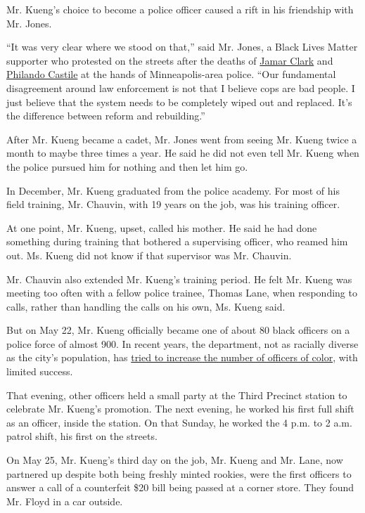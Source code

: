 Mr. Kueng's choice to become a police officer caused a rift in his
friendship with Mr. Jones.

``It was very clear where we stood on that,'' said Mr. Jones, a Black
Lives Matter supporter who protested on the streets after the deaths of
\href{https://www.nytimes3xbfgragh.onion/2015/11/20/us/minneapolis-protest-police-jamar-clark.html}{Jamar
Clark} and
\href{https://www.nytimes3xbfgragh.onion/2016/07/13/us/philando-castile-minnesota-police-shooting.html}{Philando
Castile} at the hands of Minneapolis-area police. ``Our fundamental
disagreement around law enforcement is not that I believe cops are bad
people. I just believe that the system needs to be completely wiped out
and replaced. It's the difference between reform and rebuilding.''

After Mr. Kueng became a cadet, Mr. Jones went from seeing Mr. Kueng
twice a month to maybe three times a year. He said he did not even tell
Mr. Kueng when the police pursued him for nothing and then let him go.

In December, Mr. Kueng graduated from the police academy. For most of
his field training, Mr. Chauvin, with 19 years on the job, was his
training officer.

At one point, Mr. Kueng, upset, called his mother. He said he had done
something during training that bothered a supervising officer, who
reamed him out. Ms. Kueng did not know if that supervisor was Mr.
Chauvin.

Mr. Chauvin also extended Mr. Kueng's training period. He felt Mr. Kueng
was meeting too often with a fellow police trainee, Thomas Lane, when
responding to calls, rather than handling the calls on his own, Ms.
Kueng said.

But on May 22, Mr. Kueng officially became one of about 80 black
officers on a police force of almost 900. In recent years, the
department, not as racially diverse as the city's population, has
\href{https://www.npr.org/2014/09/03/345308385/minneapolis-pd-makes-an-effort-to-hire-more-minority-officers}{tried
to increase the number of officers of color}, with limited success.

That evening, other officers held a small party at the Third Precinct
station to celebrate Mr. Kueng's promotion. The next evening, he worked
his first full shift as an officer, inside the station. On that Sunday,
he worked the 4 p.m. to 2 a.m. patrol shift, his first on the streets.

On May 25, Mr. Kueng's third day on the job, Mr. Kueng and Mr. Lane, now
partnered up despite both being freshly minted rookies, were the first
officers to answer a call of a counterfeit \$20 bill being passed at a
corner store. They found Mr. Floyd in a car outside.

